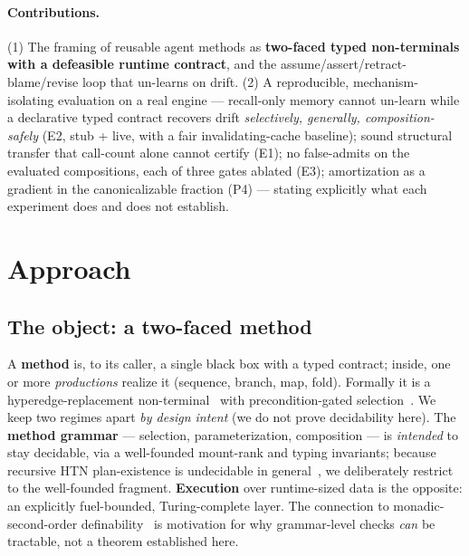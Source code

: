 \documentclass[11pt]{article}
\begin{document}
\paragraph{Contributions.} (1) The framing of reusable agent methods as \textbf{two-faced typed non-terminals with
a defeasible runtime contract}, and the assume/assert/retract-blame/revise loop that un-learns on drift. (2) A
reproducible, mechanism-isolating evaluation on a real engine --- recall-only memory cannot un-learn while a
declarative typed contract recovers drift \emph{selectively, generally, composition-safely} (E2, stub + live, with a
fair invalidating-cache baseline); sound structural transfer that call-count alone cannot certify (E1); no
false-admits on the evaluated compositions, each of three gates ablated (E3); amortization as a gradient in
the canonicalizable fraction (P4) --- stating explicitly what each experiment does and does not establish.

\section{Approach}
\subsection{The object: a two-faced method}
A \textbf{method} is, to its caller, a single black box with a typed contract; inside, one or more \emph{productions}
realize it (sequence, branch, map, fold). Formally it is a hyperedge-replacement non-terminal~\cite{habel1992,
drewes1997} with precondition-gated selection~\cite{erol1994}. We keep two regimes apart \emph{by design intent} (we
do not prove decidability here). The \textbf{method grammar} --- selection, parameterization, composition --- is
\emph{intended} to stay decidable, via a well-founded mount-rank and typing invariants; because recursive HTN
plan-existence is undecidable in general~\cite{erol1996}, we deliberately restrict to the well-founded fragment.
\textbf{Execution} over runtime-sized data is the opposite: an explicitly fuel-bounded, Turing-complete layer. The connection
to monadic-second-order definability~\cite{courcelle1990} is motivation for why grammar-level checks \emph{can} be
tractable, not a theorem established here.
\end{document}
